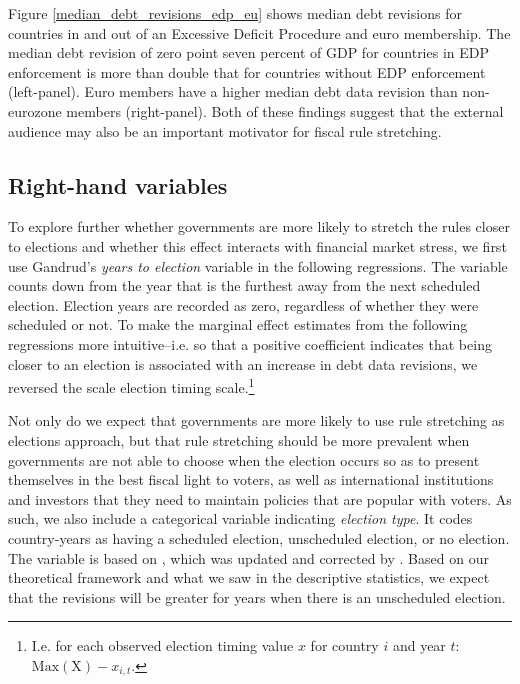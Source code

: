 \documentclass[]{article}
\begin{document}
Figure \ref{median_debt_revisions_edp_eu} shows median debt revisions for countries in and out of an Excessive Deficit Procedure and euro membership. The median debt revision of zero point seven percent of GDP for countries in EDP enforcement is more than double that for countries without EDP enforcement (left-panel). Euro members have a higher median debt data revision than non-eurozone members (right-panel). Both of these findings suggest that the external audience may also be an important motivator for fiscal rule stretching.

\subsection{Right-hand variables}

To  explore further whether governments are more likely to stretch the rules closer to elections and whether this effect interacts with financial market stress, we first use Gandrud's \citeyearpar{gandrudYrcurnt} \emph{years to election} variable in the following regressions. The variable counts down from the year that is the furthest away from the next scheduled election. Election years are recorded as zero, regardless of whether they were scheduled or not. To make the marginal effect estimates from the following regressions more intuitive--i.e. so that a positive coefficient indicates that being closer to an election is associated with an increase in debt data revisions, we reversed the scale election timing scale.\footnote{I.e. for each observed election timing value $x$ for country $i$ and year $t$: $\mathrm{Max}(\mathrm{X}) - x_{i,t}$.}

Not only do we expect that governments are more likely to use rule stretching as elections approach, but that rule stretching should be more prevalent when governments are not able to choose when the election occurs so as to present themselves in the best fiscal light to voters, as well as international institutions and investors that they need to maintain policies that are popular with voters. As such, we also include a categorical variable indicating \emph{election type}. It codes country-years as having a scheduled election, unscheduled election, or no election. The variable is based on \cite{Brender2008}, which was updated and corrected by \cite{hallerbergWehner2015}. Based on our theoretical framework and what we saw in the descriptive statistics, we expect that the revisions will be greater for years when there is an unscheduled election.
\end{document}
